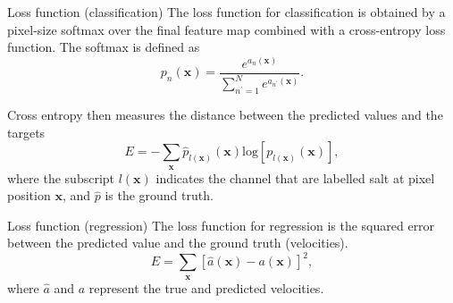 \documentclass[aspectratio=169]{beamer}
\begin{document}
\begin{frame}{Loss function (classification)}
\noindent The loss function for classification is obtained by a pixel-size softmax over the final feature map combined with a cross-entropy loss function. The softmax is defined as
\begin{equation}
p_n(\boldsymbol{x})=\frac{e^{{a_n(\boldsymbol{x})}}}{\sum_{n^\prime=1}^{N}e^{a_{n^\prime}(\boldsymbol{x})}}.
\label{eqn:softmax}
\end{equation}

\noindent Cross entropy then measures the distance between the predicted values and the targets
\begin{equation}
E=-\sum_{\boldsymbol{x}}
        \hat{p}_{l(\boldsymbol{x})}(\boldsymbol{x})
        \mathrm{log}[
        p_{l(\boldsymbol{x})}(\boldsymbol{x})
        ],
\label{eqn:crossentropy}
\end{equation}
where the subscript $l(\boldsymbol{x})$ indicates the channel that are labelled salt at pixel position $\boldsymbol{x}$, and $\hat{p}$ is the ground truth.

\end{frame}
\begin{frame}{Loss function (regression)}
\noindent The loss function for regression is the squared error between the predicted value and the ground truth (velocities). 
\begin{equation}
E=\sum_{\boldsymbol{x}}
        [\hat{a}(\boldsymbol{x})-
        a(\boldsymbol{x})]^2
        ,
\label{eqn:crossentropy}
\end{equation}
where $\hat{a}$ and $a$ represent the true and predicted velocities.

\end{frame}
\end{document}
